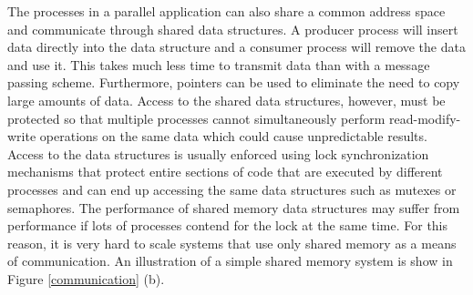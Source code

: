 \documentclass[11pt]{book}
\begin{document}
The processes in a parallel application can also share a common address space and communicate
through shared data structures.  A producer process will insert data directly into the data
structure and a consumer process will remove the data and use it.  This takes much less time
to transmit data than with a message passing scheme.  Furthermore, pointers can be used to
eliminate the need to copy large amounts of data.  Access to the shared data structures, however,
must be protected so that multiple processes cannot simultaneously perform read-modify-write
operations on the same data which could cause unpredictable results.  Access to the data
structures is usually enforced using lock synchronization mechanisms that protect entire sections
of code that are executed by different processes and can end up accessing the same data structures
such as mutexes or semaphores.  The performance of shared memory data structures may suffer
from performance if lots of processes contend for the lock at the same time.  For this reason, it
is very hard to scale systems that use only shared memory as a means of communication.
An illustration of a simple shared memory system is show in Figure \ref{communication} (b).
\end{document}
